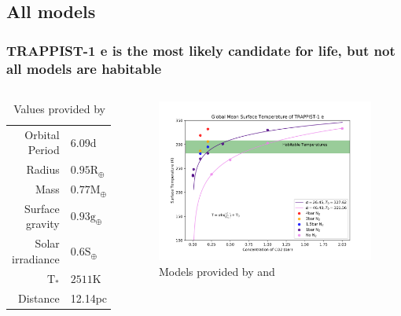 \documentclass{beamer}
\begin{document}
\subsection{All models}
\begin{frame}
    \frametitle{TRAPPIST-1 e is the most likely candidate for life, but not all
    models are habitable}
    \begin{columns}
        \begin{table}
            \begin{tabular}{r|l}
                Orbital Period & 6.09d\\
                Radius & $0.95\mathrm{R}_\oplus$\\
                Mass & $0.77\mathrm{M}_\oplus$\\
                Surface gravity & $0.93\mathrm{g}_\oplus$\\
                Solar irradiance & $0.6\mathrm{S}_\oplus$\\
                $\mathrm{T}_*$ & $2511\mathrm{K}$\\
                Distance & 12.14pc\\
            \end{tabular}
            \caption{{\scriptsize Values provided by \citet{trappistdiscovery}}}
        \end{table}
        \begin{figure}
            \includegraphics[width=\textwidth]{models/surfacet_co2.png}
            \caption{{\scriptsize Models provided by \citet{wolf17} and \citet{ravihabitablemoist}}}
        \end{figure}
    \end{columns}
\end{frame}
\end{document}

